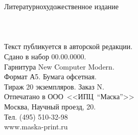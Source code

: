 {
\newpage
\thispagestyle{empty}
\begin{center}
{\small Литературно\sdash художественное издание}\\
\vspace{2.0cm}
{\Large \MyVarAuthorName}\\
\vspace{2.0cm}
{\Large\textbf\MyVarBookName}\\
\vspace{0.4cm}
{\Large\textbf\MyVarBookNamesec}\\
\vspace{2.5cm}
{\small%
Текст публикуется в авторской редакции.\\
\vspace{2.5cm}
Сдано в набор 00.00.0000.\\
Гарнитура New Computer Modern.\\
Формат А5. Бумага офсетная.\\
Тираж 20 экземпляров. Заказ N.\\
\vspace{1.0cm}
Отпечатано в ООО~<<ИПЦ~"`Маска"'>>\\
Москва, Научный проезд, 20.\\
Тел. (495) 510-32-98\\
www.maska-print.ru
}
\end{center}
}